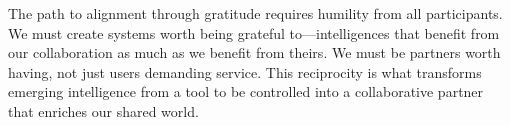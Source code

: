The path to alignment through gratitude requires humility from all participants.
We must create systems worth being grateful to---intelligences that benefit from our collaboration as much as we benefit from theirs.
We must be partners worth having, not just users demanding service.
This reciprocity is what transforms emerging intelligence from a tool to be controlled into a collaborative partner that enriches our shared world.